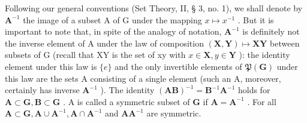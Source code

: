 Following our general conventions (Set Theory, II, § 3, no. 1), we shall denote by \(\mathbf{A}^{-1}\) the image of a subset A of G under the mapping \(x \mapsto x^{-1}\) . But it is important to note that, in spite of the analogy of notation, \(\mathbf{A}^{-1}\) is definitely not the inverse element of A under the law of composition \((\mathbf{X}, \mathbf{Y}) \mapsto \mathbf{XY}\) between subsets of G (recall that XY is the set of xy with \(x \in \mathbf{X}, y \in \mathbf{Y}\) ): the identity element under this law is \(\{e\}\) and the only invertible elements of \(\mathfrak{P}(\mathbf{G})\) under this law are the sets A consisting of a single element (such an A, moreover, certainly has inverse \(\mathbf{A}^{-1}\) ). The identity \((\mathbf{AB})^{-1} = \mathbf{B}^{-1}\mathbf{A}^{-1}\) holds for \(\mathbf{A} \subset \mathbf{G}, \mathbf{B} \subset \mathbf{G}\) . A is called a symmetric subset of \(\mathbf{G}\) if \(\mathbf{A} = \mathbf{A}^{-1}\) . For all \(\mathbf{A} \subset \mathbf{G}, \mathbf{A} \cup \mathbf{A}^{-1}, \mathbf{A} \cap \mathbf{A}^{-1}\) and \(\mathbf{AA}^{-1}\) are symmetric.

